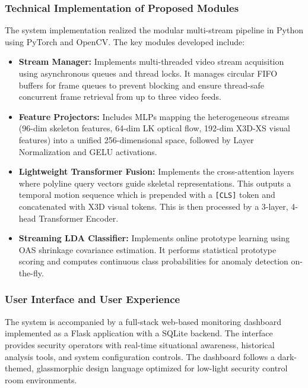 \documentclass[12pt]{article}
\begin{document}
\subsubsection{Technical Implementation of Proposed Modules}
The system implementation realized the modular multi-stream pipeline in Python using PyTorch and OpenCV. The key modules developed include:
\begin{itemize}
    \item \textbf{Stream Manager:} Implements multi-threaded video stream acquisition using asynchronous queues and thread locks. It manages circular FIFO buffers for frame queues to prevent blocking and ensure thread-safe concurrent frame retrieval from up to three video feeds.
    \item \textbf{Feature Projectors:} Includes MLPs mapping the heterogeneous streams (96-dim skeleton features, 64-dim LK optical flow, 192-dim X3D-XS visual features) into a unified 256-dimensional space, followed by Layer Normalization and GELU activations.
    \item \textbf{Lightweight Transformer Fusion:} Implements the cross-attention layers where polyline query vectors guide skeletal representations. This outputs a temporal motion sequence which is prepended with a \texttt{[CLS]} token and concatenated with X3D visual tokens. This is then processed by a 3-layer, 4-head Transformer Encoder.
    \item \textbf{Streaming LDA Classifier:} Implements online prototype learning using OAS shrinkage covariance estimation. It performs statistical prototype scoring and computes continuous class probabilities for anomaly detection on-the-fly.
\end{itemize}

\subsubsection{User Interface and User Experience}
The system is accompanied by a full-stack web-based monitoring dashboard implemented as a Flask application with a SQLite backend. The interface provides security operators with real-time situational awareness, historical analysis tools, and system configuration controls. The dashboard follows a dark-themed, glassmorphic design language optimized for low-light security control room environments.
\end{document}
